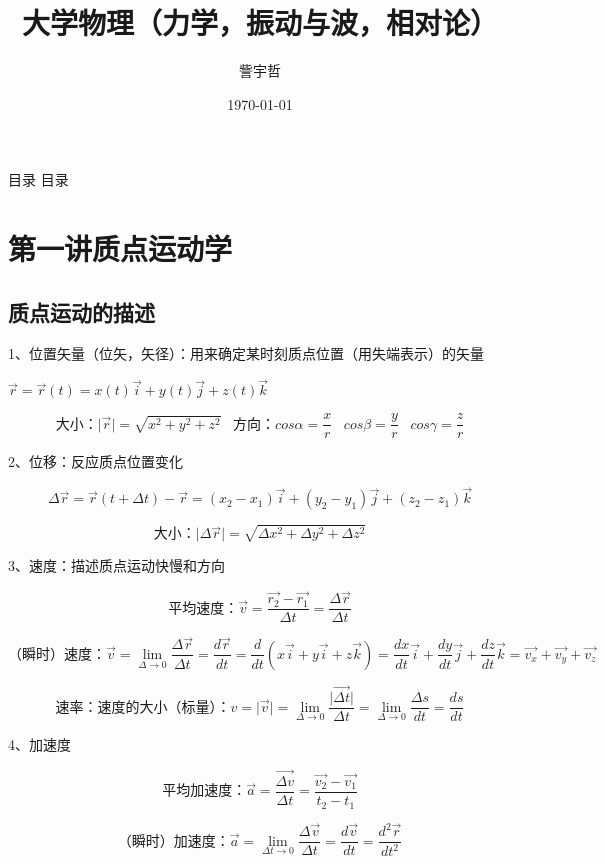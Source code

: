 \documentclass[UTF8]{article}
\begin{document}
\title{大学物理（力学，振动与波，相对论）}
\author{訾宇哲}
\date{\today}
\maketitle
\newpage
\tableofcontents
\newpage
目录
\newpage
目录
\newpage
\section{第一讲\;\;质点运动学}
\subsection{质点运动的描述}

    1、位置矢量（位矢，矢径）：用来确定某时刻质点位置（用失端表示）的矢量

    \;\;$\vec{r} = \vec{r}(t) = x(t)\vec{i}+y(t)\vec{j}+z(t)\vec{k}$

    \;\;\[\mbox{大小：}\lvert\vec{r}\rvert = \sqrt{x^2+y^2+z^2}\;\;\;\mbox{方向：}cos\alpha = \frac{x}{r}\;\;\;cos\beta = \frac{y}{r}\;\;\;cos\gamma = \frac{z}{r}\]

    2、位移：反应质点位置变化

    \[\Delta \vec{r} = \vec{r}(t + \Delta t) - \vec{r} = (x_2 - x_1)\vec{i} + (y_2-y_1)\vec{j} + (z_2 - z_1)\vec{k}\]

    \[\mbox{大小：}\lvert\Delta\vec{r}\rvert = \sqrt{\Delta x^2 + \Delta y^2 + \Delta z^2}\]

    3、速度：描述质点运动快慢和方向

    \[\mbox{平均速度：}\vec{v} = \frac{\vec{r_2} - \vec{r_1}}{\Delta t}  = \frac{\Delta \vec{r}}{\Delta t}\]

    \[\mbox{（瞬时）速度：}\vec{v} = \lim_{\Delta \rightarrow 0}\frac{\Delta \vec{r}}{\Delta t} = \frac{d\vec{r}}{dt} = \frac{d}{dt}(x\vec{i}+y\vec{i}+z\vec{k}) = \frac{dx}{dt}\vec{i}+\frac{dy}{dt}\vec{j}+\frac{dz}{dt}\vec{k} = \vec{v_x}+\vec{v_y}+\vec{v_z}\]

    \[\mbox{速率：速度的大小（标量）：}v = \lvert\vec{v}\rvert = \lim_{\Delta \rightarrow 0}\frac{\lvert\vec{\Delta t}\rvert}{\Delta t} = \lim_{\Delta \rightarrow 0}\frac{\Delta s}{dt} = \frac{ds}{dt}\]

    4、加速度

    \[\mbox{平均加速度：}\vec{a} = \frac{\vec{\Delta v}}{\Delta t} = \frac{\vec{v_2} - \vec{v_1}}{t_2 - t_1}\]

    \[\mbox{（瞬时）加速度：}\vec{a} = \lim_{\Delta t \rightarrow 0}\frac{\Delta \vec{v}}{\Delta t} = \frac{d\vec{v}}{dt} = \frac{d^2\vec{r}}{dt^2}\]
\end{document}
